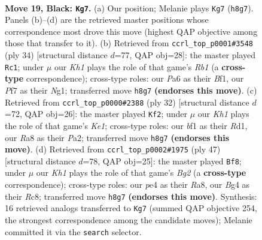 \documentclass[11pt]{article}
\begin{document}
\clearpage

\begin{figure}[p]\centering
\begin{subfigure}{0.46\textwidth}\centering
\resizebox{\linewidth}{!}{%
\newchessgame
\chessboard[
  setfen={rn3r1k/1pp1bp1P/p7/4P1p1/P1p1P1b1/2N5/1P1N4/R3KB1R b KQ - 0 19},
  showmover=false,
  pgfstyle=straightmove, color=movearrow, markmove={h8-g7}
]}
\caption{}
\end{subfigure}\hfill
\begin{subfigure}{0.46\textwidth}\centering
\resizebox{\linewidth}{!}{%
\newchessgame
\chessboard[
  setfen={r1b2rk1/p4ppp/1np5/4p3/n3P1PP/P3BP2/7R/1R2KBN1 w - - 1 18},
  showmover=false,
  pgfstyle=straightmove, color=movearrow, markmove={b1-c1}
]}
\caption{}
\end{subfigure}
\\[4pt]
\begin{subfigure}{0.46\textwidth}\centering
\resizebox{\linewidth}{!}{%
\newchessgame
\chessboard[
  setfen={1rb4r/1p2kpp1/p1n4p/4p3/N4P2/4PB2/PP4PP/3RK2R w K - 0 17},
  showmover=false,
  pgfstyle=straightmove, color=movearrow, markmove={e1-f2}
]}
\caption{}
\end{subfigure}\hfill
\begin{subfigure}{0.46\textwidth}\centering
\resizebox{\linewidth}{!}{%
\newchessgame
\chessboard[
  setfen={r1rn2k1/pp2p1b1/7p/3pPppP/P2P4/2P2N2/3B1PP1/RR4K1 b - - 0 24},
  showmover=false,
  pgfstyle=straightmove, color=movearrow, markmove={g7-f8}
]}
\caption{}
\end{subfigure}
\caption{\textbf{Move 19, Black: \texttt{Kg7}.} (a) Our position; Melanie plays \texttt{Kg7} (\texttt{h8g7}). Panels (b)--(d) are the retrieved master positions whose correspondence most drove this move (highest QAP objective among those that transfer to it). (b) Retrieved from \texttt{ccrl\_top\_p0001\#3548} (ply 34) [structural distance $d$=77, QAP obj=28]: the master played \texttt{Rc1}; under $\mu$ our \emph{Kh1} plays the role of that game's \emph{Rb1} (a \textbf{cross-type} correspondence); cross-type roles: our \emph{P}a6 as their \emph{B}f1, our \emph{P}f7 as their \emph{N}g1; transferred move \texttt{h8g7} \textbf{(endorses this move)}. (c) Retrieved from \texttt{ccrl\_top\_p0000\#2388} (ply 32) [structural distance $d$=72, QAP obj=26]: the master played \texttt{Kf2}; under $\mu$ our \emph{Kh1} plays the role of that game's \emph{Ke1}; cross-type roles: our \emph{b}f1 as their \emph{R}d1, our \emph{R}a8 as their \emph{P}a2; transferred move \texttt{h8g7} \textbf{(endorses this move)}. (d) Retrieved from \texttt{ccrl\_top\_p0002\#1975} (ply 47) [structural distance $d$=78, QAP obj=25]: the master played \texttt{Bf8}; under $\mu$ our \emph{Kh1} plays the role of that game's \emph{Bg2} (a \textbf{cross-type} correspondence); cross-type roles: our \emph{p}e4 as their \emph{R}a8, our \emph{B}g4 as their \emph{R}c8; transferred move \texttt{h8g7} \textbf{(endorses this move)}. Synthesis: 16 retrieved analogs transferred to \texttt{Kg7} (summed QAP objective 254, the strongest correspondence among the candidate moves); Melanie committed it via the \texttt{search} selector.}
\label{fig:thought-m37}
\end{figure}
\end{document}
